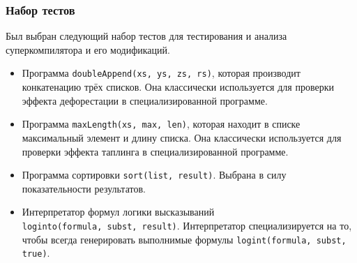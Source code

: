 \subsubsection{Набор тестов}

Был выбран следующий набор тестов для тестирования и анализа суперкомпилятора и его модификаций.
\begin{itemize}
 \item Программа \lstinline{doubleAppend(xs, ys, zs, rs)}, которая
       производит конкатенацию трёх списков. Она классически используется
       для проверки эффекта дефорестации в специализированной программе.
 \item Программа \lstinline{maxLength(xs, max, len)}, которая находит в списке
       максимальный элемент и длину списка. Она классически используется
       для проверки эффекта таплинга в специализированной программе. 
 \item Программа сортировки \lstinline{sort(list, result)}. Выбрана в силу показательности
       результатов.
 \item Интерпретатор формул логики высказываний \\ \lstinline{loginto(formula, subst, result)}.
       Интерпретатор специализируется на то, чтобы всегда генерировать выполнимые формулы
       \lstinline{logint(formula, subst, true)}.

\end{itemize}
